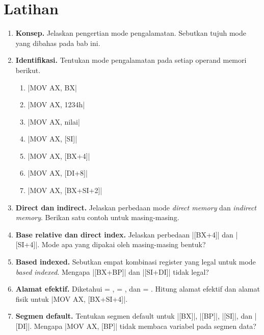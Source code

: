 \section{Latihan}
\label{sec:latihan-bab12}

\begin{enumerate}
    \item \textbf{Konsep.} Jelaskan pengertian mode pengalamatan.
          Sebutkan tujuh mode yang dibahas pada bab ini.

    \item \textbf{Identifikasi.} Tentukan mode pengalamatan pada
          setiap operand memori berikut.
          \begin{enumerate}
              \item \lstasm|MOV AX, BX|
              \item \lstasm|MOV AX, 1234h|
              \item \lstasm|MOV AX, nilai|
              \item \lstasm|MOV AX, [SI]|
              \item \lstasm|MOV AX, [BX+4]|
              \item \lstasm|MOV AX, [DI+8]|
              \item \lstasm|MOV AX, [BX+SI+2]|
          \end{enumerate}

    \item \textbf{Direct dan indirect.} Jelaskan perbedaan mode
          \textit{direct memory} dan \textit{indirect memory}.
          Berikan satu contoh untuk masing-masing.

    \item \textbf{Base relative dan direct index.} Jelaskan
          perbedaan \lstasm|[BX+4]| dan \lstasm|[SI+4]|. Mode apa
          yang dipakai oleh masing-masing bentuk?

    \item \textbf{Based indexed.} Sebutkan empat kombinasi register
          yang legal untuk mode \textit{based indexed}. Mengapa
          \lstasm|[BX+BP]| dan \lstasm|[SI+DI]| tidak legal?

    \item \textbf{Alamat efektif.} Diketahui  = ,
           = , dan  = .
          Hitung alamat efektif dan alamat fisik untuk
          \lstasm|MOV AX, [BX+SI+4]|.

    \item \textbf{Segmen default.} Tentukan segmen default untuk
          \lstasm|[BX]|, \lstasm|[BP]|, \lstasm|[SI]|, dan
          \lstasm|[DI]|. Mengapa \lstasm|MOV AX, [BP]| tidak membaca
          variabel pada segmen data?


\end{enumerate}
